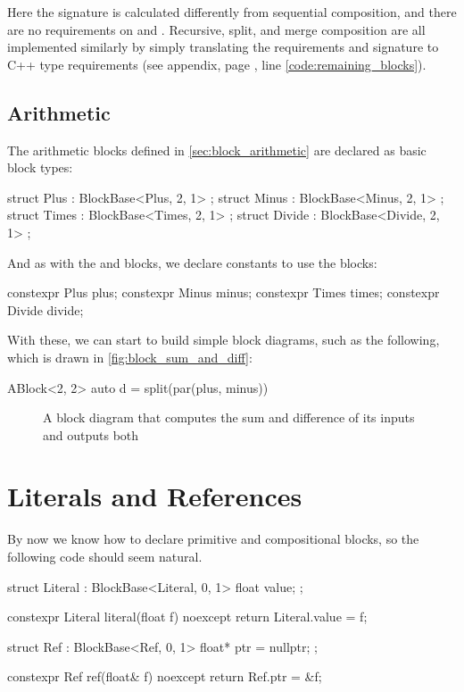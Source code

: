 Here the signature is calculated differently from sequential composition, and there are no requirements on
 and . Recursive, split, and merge composition are all
implemented similarly by simply translating the requirements and signature to C++ type requirements (see
appendix, page \pageref{code:remaining_blocks}, line \ref{code:remaining_blocks}).

\subsection{Arithmetic}

The arithmetic blocks defined in \autoref{sec:block_arithmetic} are declared as basic block types:

\begin{cppcodenl}
  struct Plus : BlockBase<Plus, 2, 1> {};
  struct Minus : BlockBase<Minus, 2, 1> {};
  struct Times : BlockBase<Times, 2, 1> {};
  struct Divide : BlockBase<Divide, 2, 1> {};
\end{cppcodenl}

And as with the \Ident and \Cut blocks, we declare constants to use the blocks:
\begin{cppcodenl}
  constexpr Plus plus;
  constexpr Minus minus;
  constexpr Times times;
  constexpr Divide divide;
\end{cppcodenl}

With these, we can start to build simple block diagrams, such as the following, which is drawn in
\autoref{fig:block_sum_and_diff}:

\begin{cppcodenl}
  ABlock<2, 2> auto d = split(par(plus, minus))
\end{cppcodenl}

\begin{figure}
  \centering
  
  \caption{A block diagram that computes the sum and difference of its inputs and outputs both}
  \label{fig:block_sum_and_diff}
\end{figure}

\section{Literals and References}
\label{sec:eda_lit_and_ref}

By now we know how to declare primitive and compositional blocks, so the following code should seem natural.
\newpage
\begin{cppcodenl}
  struct Literal : BlockBase<Literal, 0, 1> {
    float value;
  };

  constexpr Literal literal(float f) noexcept {
    return Literal{.value = f};
  }

  struct Ref : BlockBase<Ref, 0, 1> {
    float* ptr = nullptr;
  };

  constexpr Ref ref(float& f) noexcept
  {
    return Ref{.ptr = &f};
  }
\end{cppcodenl}

